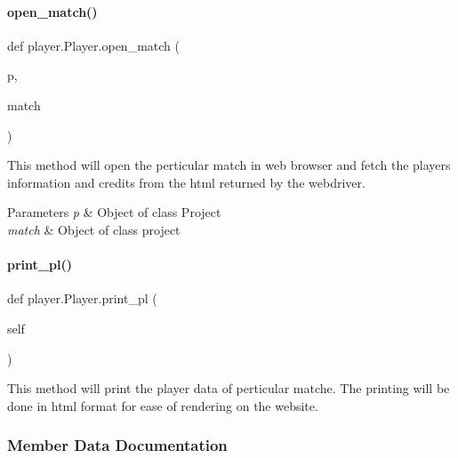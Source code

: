 \paragraph{\texorpdfstring{open\+\_\+match()}{open\_match()}}
{\footnotesize\ttfamily def player.\+Player.\+open\+\_\+match (\begin{DoxyParamCaption}\item[{}]{p,  }\item[{}]{match }\end{DoxyParamCaption})}



This method will open the perticular match in web browser and fetch the players information and credits from the html returned by the webdriver. 


\begin{DoxyParams}{Parameters}
{\em p} & Object of class Project\\
\hline
{\em match} & Object of class project \\
\hline
\end{DoxyParams}
\mbox{\label{classplayer_1_1Player_a8b277fba24c5895f6db4340be1506e19}} 
\paragraph{\texorpdfstring{print\+\_\+pl()}{print\_pl()}}
{\footnotesize\ttfamily def player.\+Player.\+print\+\_\+pl (\begin{DoxyParamCaption}\item[{}]{self }\end{DoxyParamCaption})}

\begin{DoxyVerb}This method will print the player data of perticular matche. The printing will be done in html format for ease of rendering on the website.\end{DoxyVerb}
 

\subsubsection{Member Data Documentation}
\mbox{\label{classplayer_1_1Player_a605eba470b33f493297f7e0aa15d6ab9}} 
